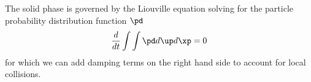 The solid phase is governed by the Liouville equation solving for the particle probability distribution function $\pd$
\begin{equation*}
        \dfrac{d}{dt} \int \int \pd d \up d \xp = 0
\end{equation*}
for which we can add damping terms on the right hand side to account for local collisions.


